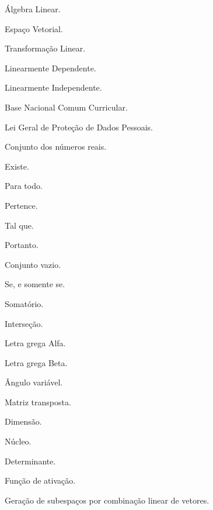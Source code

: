 \documentclass[
12pt,
 a4paper,
    english,
    brazil,
    oneside
    ]{abntex2}
\begin{document}
\listoffigures*
\cleardoublepage


\listoftables*
\cleardoublepage

\begin{siglas}
	\item[AL] Álgebra Linear.
	\item[EV] Espaço Vetorial.
	\item[TL] Transformação Linear.
	\item[LD] Linearmente Dependente.
	\item[LI] Linearmente Independente.
	\item[BNCC] Base Nacional Comum Curricular.
	\item[LGPD] Lei Geral de Proteção de Dados Pessoais.
\end{siglas}

\begin{simbolos}
	\item[$ \mathbb{R} $] Conjunto dos números reais.
	\item[$\exists$] Existe.
	\item[$\forall$] Para todo.
	\item[$\in$] Pertence.
	\item[$\mid$] Tal que.
	\item[$\therefore$] Portanto.
	\item[$\emptyset$] Conjunto vazio.
	\item[$\iff$] Se, e somente se.
	\item[$\sum$] Somatório.
	\item[$\cap$] Interseção.
	\item[$\alpha$] Letra grega Alfa.
	\item[$\beta$] Letra grega Beta.
	\item[$\theta$] Ângulo variável.
	\item[$A^T$] Matriz transposta.
	\item[$\dim$] Dimensão.
	\item[$\ker$] Núcleo.
	\item[$\det$] Determinante.
	\item[$\sigma$] Função de ativação.
	\item[Span] Geração de subespaços por combinação linear de vetores.
\end{simbolos}
\end{document}
